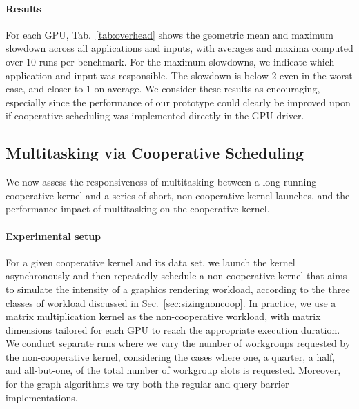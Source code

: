 \documentclass[numbers,nocopyrightspace,10pt]{sigplanconf}
\newcommand{\mytab}{Tab.~}
\newcommand{\mysec}{Sec.~}
\begin{document}
\paragraph{Results}
For each GPU, \mytab\ref{tab:overhead} shows the geometric mean and
maximum slowdown across all applications and inputs, with averages and
maxima computed over 10 runs per benchmark. For the maximum slowdowns,
we indicate which application and input was responsible. The slowdown is
below 2 even in the worst case, and closer to 1 on average. We consider
these results as encouraging, especially since the performance of our
prototype could clearly be improved upon if cooperative scheduling was
implemented directly in the GPU driver.

\subsection{Multitasking via Cooperative Scheduling}\label{sec:responsiveness}

We now assess the responsiveness of multitasking between a long-running cooperative kernel and a series of
short, non-cooperative kernel launches, and the performance impact of multitasking on the cooperative kernel.


\paragraph{Experimental setup}
For a given cooperative kernel and its data set, we launch the kernel
asynchronously and then repeatedly schedule a non-cooperative kernel
that aims to simulate the intensity of a graphics rendering workload,
according to the three classes of workload discussed in \mysec\ref{sec:sizingnoncoop}. In
practice, we use a matrix multiplication kernel as the non-cooperative
workload, with matrix dimensions tailored for each GPU to reach the
appropriate execution duration.  We conduct separate runs where we vary
the number of workgroups requested by the non-cooperative kernel,
considering the cases where one, a quarter, a half, and all-but-one, of
the total number of workgroup slots is requested.  Moreover, for the
graph algorithms we try both the regular and query barrier
implementations.
\end{document}
